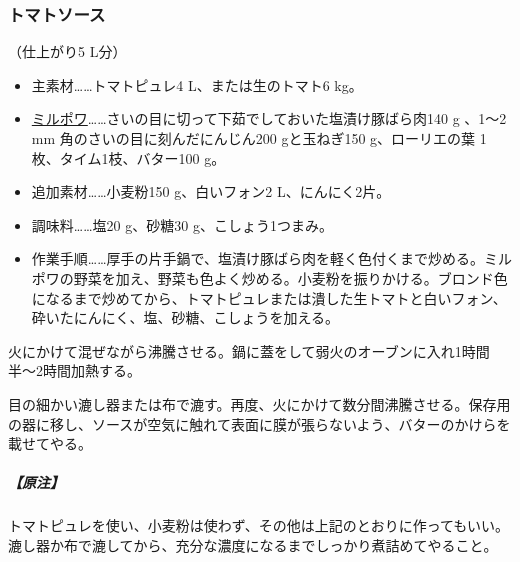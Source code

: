 \begin{recette}
\atoaki{}

\hypertarget{sauce-tomate}{%
\subsubsection{トマトソース}\label{sauce-tomate}}


 

（仕上がり5 L分）

\begin{itemize}
\item
  主素材\ldots{}\ldots{}トマトピュレ4 L、または生のトマト6 kg。
\item
  \protect\hyperlink{mirepoix}{ミルポワ}\ldots{}\ldots{}さいの目に切って下茹でしておいた塩漬け豚ばら肉140
  g 、1〜2 mm 角のさいの目に刻んだにんじん200 gと玉ねぎ150
  g、ローリエの葉 1枚、タイム1枝、バター100 g。
\item
  追加素材\ldots{}\ldots{}小麦粉150 g、白いフォン2 L、にんにく2片。
\item
  調味料\ldots{}\ldots{}塩20 g、砂糖30 g、こしょう1つまみ。
\item
  作業手順\ldots{}\ldots{}厚手の片手鍋で、塩漬け豚ばら肉を軽く色付くまで炒める。ミルポワの野菜を加え、野菜も色よく炒める。小麦粉を振りかける。ブロンド色になるまで炒めてから、トマトピュレまたは潰した生トマトと白いフォン、砕いたにんにく、塩、砂糖、こしょうを加える。
\end{itemize}

火にかけて混ぜながら沸騰させる。鍋に蓋をして弱火のオーブンに入れ1時間半〜2時間加熱する。

目の細かい漉し器または布で漉す。再度、火にかけて数分間沸騰させる。保存用の器に移し、ソースが空気に触れて表面に膜が張らないよう、バターのかけらを載せてやる。

\hypertarget{nota-sauce-tomate}{%
\subparagraph{【原注】}\label{nota-sauce-tomate}}

トマトピュレを使い、小麦粉は使わず、その他は上記のとおりに作ってもいい。漉し器か布で漉してから、充分な濃度になるまでしっかり煮詰めてやること。

\end{recette}